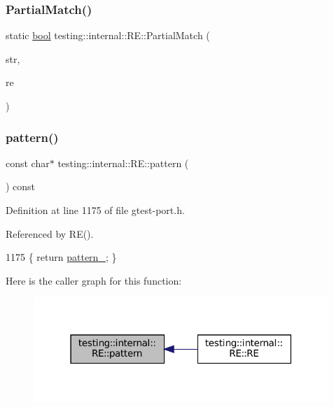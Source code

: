 \subsubsection{\texorpdfstring{Partial\+Match()}{PartialMatch()}\hspace{0.1cm}{\footnotesize\ttfamily [2/2]}}
{\footnotesize\ttfamily static \hyperlink{classbool}{bool} testing\+::internal\+::\+R\+E\+::\+Partial\+Match (\begin{DoxyParamCaption}\item[{const char $\ast$}]{str,  }\item[{const \hyperlink{classtesting_1_1internal_1_1RE}{RE} \&}]{re }\end{DoxyParamCaption})\hspace{0.3cm}{\ttfamily [static]}}

\mbox{\label{classtesting_1_1internal_1_1RE_a24236aab3a6b0183a145a6f4c0bb9848}} 
\subsubsection{\texorpdfstring{pattern()}{pattern()}}
{\footnotesize\ttfamily const char$\ast$ testing\+::internal\+::\+R\+E\+::pattern (\begin{DoxyParamCaption}{ }\end{DoxyParamCaption}) const\hspace{0.3cm}{\ttfamily [inline]}}



Definition at line 1175 of file gtest-\/port.\+h.



Referenced by R\+E().


\begin{DoxyCode}
1175 \{ \textcolor{keywordflow}{return} \hyperlink{classtesting_1_1internal_1_1RE_a44ab32241fab42db5b6f7482776658ec}{pattern\_}; \}
\end{DoxyCode}
Here is the caller graph for this function\+:
\nopagebreak
\begin{figure}[H]
\begin{center}
\leavevmode
\includegraphics[width=316pt]{classtesting_1_1internal_1_1RE_a24236aab3a6b0183a145a6f4c0bb9848_icgraph}
\end{center}
\end{figure}


